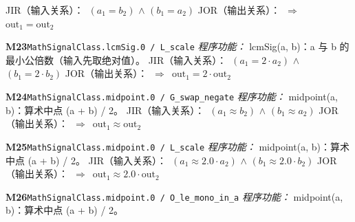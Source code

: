 \documentclass[11pt]{article}
\begin{document}
\hspace*{1.5em}JIR（输入关系）：\ $(a_{1} = b_{2})$ $\wedge$ $(b_{1} = a_{2})$\newline
\hspace*{1.5em}JOR（输出关系）：\ $\Rightarrow$\ $\mathrm{out}_{1} = \mathrm{out}_{2}$\par\medskip
\textbf{M23}\quad \texttt{MathSignalClass.lcmSig.0 / L\_scale}\newline
\hspace*{1.5em}\emph{程序功能：} lcmSig(a, b)：\textbar{}a\textbar{} 与 \textbar{}b\textbar{} 的最小公倍数（输入先取绝对值）。\newline
\hspace*{1.5em}JIR（输入关系）：\ $(a_{1} = 2\cdot a_{2})$ $\wedge$ $(b_{1} = 2\cdot b_{2})$\newline
\hspace*{1.5em}JOR（输出关系）：\ $\Rightarrow$\ $\mathrm{out}_{1} = 2\cdot \mathrm{out}_{2}$\par\medskip
\textbf{M24}\quad \texttt{MathSignalClass.midpoint.0 / G\_swap\_negate}\newline
\hspace*{1.5em}\emph{程序功能：} midpoint(a, b)：算术中点 (a + b) / 2。\newline
\hspace*{1.5em}JIR（输入关系）：\ $(a_{1} \approx  b_{2})$ $\wedge$ $(b_{1} \approx  a_{2})$\newline
\hspace*{1.5em}JOR（输出关系）：\ $\Rightarrow$\ $\mathrm{out}_{1} \approx  \mathrm{out}_{2}$\par\medskip
\textbf{M25}\quad \texttt{MathSignalClass.midpoint.0 / L\_scale}\newline
\hspace*{1.5em}\emph{程序功能：} midpoint(a, b)：算术中点 (a + b) / 2。\newline
\hspace*{1.5em}JIR（输入关系）：\ $(a_{1} \approx  2.0\cdot a_{2})$ $\wedge$ $(b_{1} \approx  2.0\cdot b_{2})$\newline
\hspace*{1.5em}JOR（输出关系）：\ $\Rightarrow$\ $\mathrm{out}_{1} \approx  2.0\cdot \mathrm{out}_{2}$\par\medskip
\textbf{M26}\quad \texttt{MathSignalClass.midpoint.0 / O\_le\_mono\_in\_a}\newline
\hspace*{1.5em}\emph{程序功能：} midpoint(a, b)：算术中点 (a + b) / 2。\newline
\end{document}
